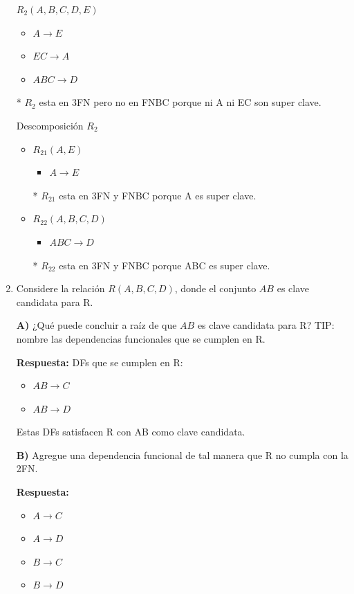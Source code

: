 \documentclass{templateNote}
\begin{document}
\begin{enumerate}
    $R_2 (A,B,C,D,E)$
    \begin{itemize}
        \item $A \rightarrow E$ 
        \item $EC \rightarrow A$
        \item $ABC \rightarrow D$
    \end{itemize}

    * $R_2$ esta en 3FN pero no en FNBC porque ni A ni EC son super clave.

    Descomposición $R_2$
    \begin{itemize}
        \item $R_{21}(A,E)$
        \begin{itemize}
            \item $A \rightarrow E$
        \end{itemize}

        * $R_{21}$ esta en 3FN y FNBC porque A es super clave.
        \item $R_{22}(A,B,C,D)$
        \begin{itemize}
            \item $ABC \rightarrow D$
        \end{itemize}

        * $R_{22}$ esta en 3FN y FNBC porque ABC es super clave.
    \end{itemize}

    \item Considere la relación $R(A,B,C,D)$, donde el conjunto $AB$ es clave candidata para R.
    
    \textbf{A)} ¿Qué puede concluir a raíz de que $AB$ es clave candidata para R? TIP: nombre las dependencias funcionales que se cumplen en R.
    
    \textbf{Respuesta:}
    DFs que se cumplen en R:
    \begin{itemize}
        \item $AB \rightarrow C$
        \item $AB \rightarrow D$
    \end{itemize}

    Estas DFs satisfacen R con AB como clave candidata.

    \textbf{B)} Agregue una dependencia funcional de tal manera que R no cumpla con la 2FN.

    \textbf{Respuesta:}

    \begin{itemize}
        \item $A \rightarrow C$
        \item $A \rightarrow D$
        \item $B \rightarrow C$
        \item $B \rightarrow D$
    \end{itemize}
    

\end{enumerate}
\end{document}
